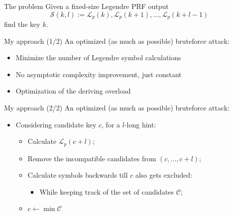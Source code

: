 \documentclass{beamer}
\theoremstyle{definition}
\theoremstyle{remark}
\renewcommand{\L}{\mathcal{L}}
\renewcommand{\S}{\mathcal{S}}
\newcommand{\C}{\mathcal{C}}
\begin{document}
\begin{frame}{The problem}
Given a fixed-size Legendre PRF output 
\[\S(k,l) := \L_p(k), \L_p(k+1), \ldots,\L_p(k+l-1)\]
find the key $k$.
\end{frame}
\begin{frame}{My approach (1/2)}
An optimized (as much as possible) bruteforce attack:
\bigskip
\begin{itemize}
\item Minimize the number of Legendre symbol calculations
\item No asymptotic complexity improvement, just constant
\item Optimization of the deriving overload
\end{itemize}
\end{frame}
\begin{frame}{My approach (2/2)}
An optimized (as much as possible) bruteforce attack:
\bigskip
\begin{itemize}
\item Considering candidate key $c$, for a $l$-long hint:
\begin{itemize}
    \item Calculate $\L_p(c+l)$;
    \item Remove the incompatible candidates from $(c, \ldots, c+l)$;
    \item Calculate symbols backwards till $c$ also gets excluded:
    \begin{itemize}
        \item While keeping track of the set of candidates $\C$;
    \end{itemize}
    \item $c\leftarrow \min \C$
\end{itemize}
\end{itemize}
\end{frame}
\end{document}
